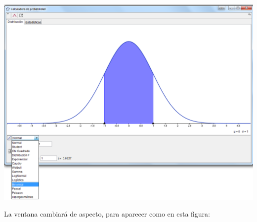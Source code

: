 \documentclass[10pt,a4paper]{article}\usepackage[]{graphicx}\usepackage[]{color}
\begin{document}
\begin{center}
    \includegraphics[width=15cm]{../fig/Tut05-23.png}
\end{center}

La ventana cambiará de aspecto, para aparecer como en esta figura:
\end{document}
